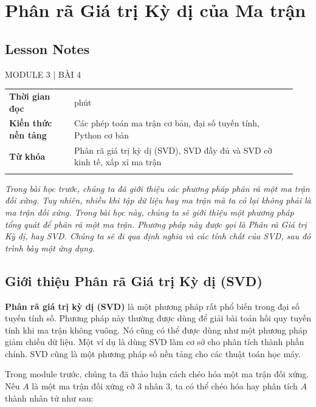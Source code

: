 \chapter{Phân rã Giá trị Kỳ dị của Ma trận}
\label{ch:M3L4}


\section*{Lesson Notes}

MODULE 3 | BÀI 4

{\small
\begin{longtable}{>{\raggedright\arraybackslash}p{0.213\linewidth}>{\raggedright\arraybackslash}p{0.727\linewidth}}
\toprule
\textbf{Thời gian đọc} & 60 phút \\
\addlinespace[2pt]
\textbf{Kiến thức nền tảng} & Các phép toán ma trận cơ bản, đại số tuyến tính, Python cơ bản \\
\addlinespace[2pt]
\textbf{Từ khóa} & Phân rã giá trị kỳ dị (SVD), SVD đầy đủ và SVD cỡ kinh tế, xấp xỉ ma trận \\
\addlinespace[2pt]
\bottomrule
\end{longtable}
}

\emph{Trong bài học trước, chúng ta đã giới thiệu các phương pháp phân rã một ma trận đối xứng. Tuy nhiên, nhiều khi tập dữ liệu hay ma trận mà ta có lại không phải là ma trận đối xứng. Trong bài học này, chúng ta sẽ giới thiệu một phương pháp tổng quát để phân rã một ma trận. Phương pháp này được gọi là Phân rã Giá trị Kỳ dị, hay SVD. Chúng ta sẽ đi qua định nghĩa và các tính chất của SVD, sau đó trình bày một ứng dụng.}

\section{Giới thiệu Phân rã Giá trị Kỳ dị (SVD)}

\textbf{Phân rã giá trị kỳ dị (SVD)} là một phương pháp rất phổ biến trong đại số tuyến tính số. Phương pháp này thường được dùng để giải bài toán hồi quy tuyến tính khi ma trận không vuông. Nó cũng có thể được dùng như một phương pháp giảm chiều dữ liệu. Một ví dụ là dùng SVD làm cơ sở cho phân tích thành phần chính. SVD cũng là một phương pháp số nền tảng cho các thuật toán học máy.

Trong module trước, chúng ta đã thảo luận cách chéo hóa một ma trận đối xứng. Nếu $A$ là một ma trận đối xứng cỡ 3 nhân 3, ta có thể chéo hóa hay phân tích $A$ thành nhân tử như sau:

